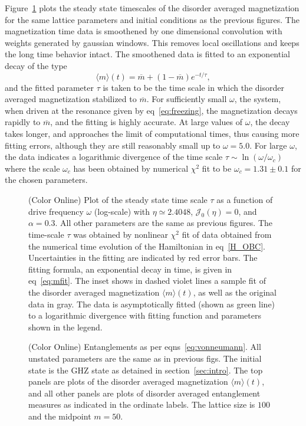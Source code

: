 \documentclass[a4paper,10pt]{article}
\begin{document}
Figure~\ref{fig:timescales} plots the steady state timescales of the disorder averaged magnetization for the same lattice parameters and initial conditions as the previous figures. The magnetization time data is smoothened by one dimensional convolution with weights generated by gaussian windows. This removes local oscillations and keeps the long time behavior intact. The smoothened data is fitted to an exponential decay of the type
\begin{equation}
\label{eq:mfit}
\langle m \rangle (t) =  \overline{m} + \left(1-\overline{m}\right)e^{-t/\tau},
\end{equation}
and the fitted parameter $\tau$ is taken to be the time scale in which the disorder averaged magnetization stabilized to $\overline{m}$. For sufficiently small $\omega$, the system, when driven at the resonance given by eq~\ref{eq:freezing}, the magnetization decays rapidly to $\overline{m}$, and the fitting is highly accurate. At large values of $\omega$, the decay takes longer, and approaches the limit of computational times, thus causing more fitting errors, although they are still reasonably small up to $\omega=5.0$. For large $\omega$, the data indicates a logarithmic divergence of the time scale $\tau\sim \ln{\left(\omega/\omega_c\right)}$ where the scale $\omega_c$ has been obtained by numerical $\chi^2$ fit to be $\omega_c=1.31\pm 0.1$ for the chosen parameters.
\begin{figure}		
\caption{(Color Online) Plot of the steady state time scale $\tau$ as a function of drive frequency $\omega$ (log-scale) with $\eta\simeq 2.4048$, $\mathcal{J}_0(\eta)=0$, and $\alpha=0.3$. All other parameters are the same as previous figures. The time-scale $\tau$ was obtained by nonlinear $\chi^2$ fit of data obtained from the numerical time evolution of the Hamiltonian in eq~\ref{H_OBC}. Uncertainties in the fitting are indicated by red error bars. The fitting formula, an exponential decay in time, is given in eq~\ref{eq:mfit}. The inset shows in dashed violet lines a sample fit of the disorder averaged magnetization $\langle m \rangle (t)$, as well as the original data in gray. The data is asymptotically fitted (shown as green line) to a logarithmic divergence with fitting function and parameters shown in the legend.}		
\label{fig:timescales}		
\end{figure}
\begin{figure}[hbt]		
\caption{(Color Online) Entanglements as per eqns~\ref{eq:vonneumann}. All unstated parameters are the same as in previous figs. The initial state is the GHZ state as detained in section~\ref{sec:intro}. The top panels are plots of the disorder averaged magnetization $\langle m \rangle (t)$, and all other panels are plots of disorder averaged entanglement measures as indicated in the ordinate labels. The lattice size is $100$ and the midpoint $m=50$.}		
\label{fig:ents}		
\end{figure}
\end{document}
